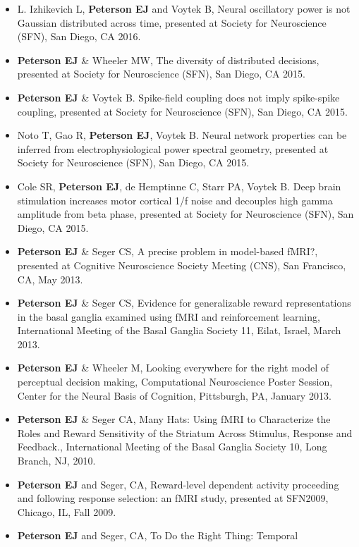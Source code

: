 \begin{itemize}
\item
  L. Izhikevich L, \textbf{Peterson EJ} and Voytek B, Neural oscillatory
  power is not Gaussian distributed across time, presented at Society
  for Neuroscience (SFN), San Diego, CA 2016.
\item
  \textbf{Peterson EJ} \& Wheeler MW, The diversity of distributed
  decisions, presented at Society for Neuroscience (SFN), San Diego, CA
  2015.
\item
  \textbf{Peterson EJ} \& Voytek B. Spike-field coupling does not imply
  spike-spike coupling, presented at Society for Neuroscience (SFN), San
  Diego, CA 2015.
\item
  Noto T, Gao R, \textbf{Peterson EJ}, Voytek B. Neural network
  properties can be inferred from electrophysiological power spectral
  geometry, presented at Society for Neuroscience (SFN), San Diego, CA
  2015.
\item
  Cole SR, \textbf{Peterson EJ}, de Hemptinne C, Starr PA, Voytek B.
  Deep brain stimulation increases motor cortical 1/f noise and
  decouples high gamma amplitude from beta phase, presented at Society
  for Neuroscience (SFN), San Diego, CA 2015.
\item
  \textbf{Peterson EJ} \& Seger CS, A precise problem in model-based
  fMRI?, presented at Cognitive Neuroscience Society Meeting (CNS), San
  Francisco, CA, May 2013.
\item
  \textbf{Peterson EJ} \& Seger CS, Evidence for generalizable reward
  representations in the basal ganglia examined using fMRI and
  reinforcement learning, International Meeting of the Basal Ganglia
  Society 11, Eilat, Israel, March 2013.
\item
  \textbf{Peterson EJ} \& Wheeler M, Looking everywhere for the right
  model of perceptual decision making, Computational Neuroscience Poster
  Session, Center for the Neural Basis of Cognition, Pittsburgh, PA,
  January 2013.
\item
  \textbf{Peterson EJ} \& Seger CA, Many Hats: Using fMRI to
  Characterize the Roles and Reward Sensitivity of the Striatum Across
  Stimulus, Response and Feedback., International Meeting of the Basal
  Ganglia Society 10, Long Branch, NJ, 2010.
\item
  \textbf{Peterson EJ} and Seger, CA, Reward-level dependent activity
  proceeding and following response selection: an fMRI study, presented
  at SFN2009, Chicago, IL, Fall 2009.
\item
  \textbf{Peterson EJ} and Seger, CA, To Do the Right Thing: Temporal

\end{itemize}
